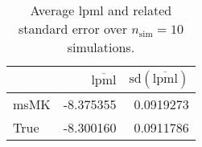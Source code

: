 \begin{table}[H]

\caption{Average lpml and related standard error over $n_{\text{sim}} = 10$ simulations.}
\centering
\begin{tabular}[t]{lrr}
\toprule
  & $\overbar{\text{lpml}}$ & $\text{sd}(\overbar{\text{lpml}})$\\
\midrule
msMK & -8.375355 & 0.0919273\\
True & -8.300160 & 0.0911786\\
\bottomrule
\end{tabular}
\end{table}